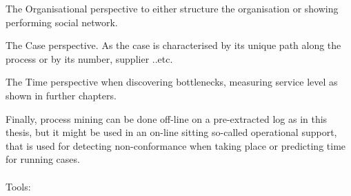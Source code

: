 The Organisational perspective to either structure the organisation or showing performing social network.

The Case perspective. As the case is characterised by its unique path along the process or by its number, supplier ..etc.

The Time perspective when discovering bottlenecks, measuring service level as shown in further chapters.

Finally, process mining can be done off-line  on a pre-extracted log as in this thesis, but it might be used in an on-line sitting so-called operational support, that is used for detecting non-conformance when taking place or predicting time for running cases.
\\
\\
Tools: